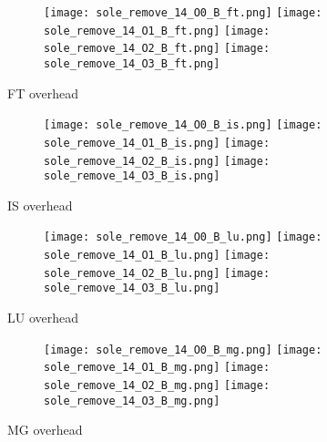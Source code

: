 \documentclass[11pt]{article}
\begin{document}
    \begin{figure}[!ht]
        \begin{subfigure}{\linewidth}
            \texttt{[image: sole\_remove\_14\_O0\_B\_ft.png]}
            \texttt{[image: sole\_remove\_14\_O1\_B\_ft.png]}
            \texttt{[image: sole\_remove\_14\_O2\_B\_ft.png]}
            \texttt{[image: sole\_remove\_14\_O3\_B\_ft.png]}
        \end{subfigure}\par\medskip
        \caption{FT overhead}\label{fig:figure4}
    \end{figure}
\begin{figure}[!ht]
        \begin{subfigure}{\linewidth}
            \texttt{[image: sole\_remove\_14\_O0\_B\_is.png]}\hfill
            \texttt{[image: sole\_remove\_14\_O1\_B\_is.png]}\hfill
            \texttt{[image: sole\_remove\_14\_O2\_B\_is.png]}\hfill
            \texttt{[image: sole\_remove\_14\_O3\_B\_is.png]}\hfill
        \end{subfigure}\par\medskip
        \caption{IS overhead}\label{fig:figure5}
\end{figure}

    \begin{figure}[!ht]
        \begin{subfigure}{\linewidth}
            \texttt{[image: sole\_remove\_14\_O0\_B\_lu.png]}\hfill
            \texttt{[image: sole\_remove\_14\_O1\_B\_lu.png]}\hfill
            \texttt{[image: sole\_remove\_14\_O2\_B\_lu.png]}\hfill
            \texttt{[image: sole\_remove\_14\_O3\_B\_lu.png]}\hfill
        \end{subfigure}\par\medskip
        \caption{LU overhead}\label{fig:figure6}
    \end{figure}

    \begin{figure}[!ht]
        \begin{subfigure}{\linewidth}
            \texttt{[image: sole\_remove\_14\_O0\_B\_mg.png]}\hfill
            \texttt{[image: sole\_remove\_14\_O1\_B\_mg.png]}\hfill
            \texttt{[image: sole\_remove\_14\_O2\_B\_mg.png]}\hfill
            \texttt{[image: sole\_remove\_14\_O3\_B\_mg.png]}\hfill
        \end{subfigure}\par\medskip
        \caption{MG overhead}\label{fig:figure7}
    \end{figure}
\end{document}
